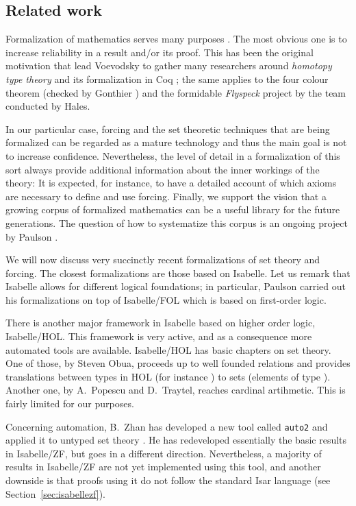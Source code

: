 \subsection{Related work}\label{sec:related-work}
Formalization of mathematics serves many purposes
\cite{simpson-theorem-proving-math}. The most obvious one is to
increase reliability in a result and/or its proof. This has been the
original motivation that lead Voevodsky to gather many researchers
around \emph{homotopy type theory} and its formalization in Coq
\cite{hottbook}; the same applies to the four colour theorem (checked
by Gonthier \cite{MR2463991}) and the formidable \emph{Flyspeck}
project \cite{MR3659768} by the team conducted by Hales.

In our particular case, forcing and the set theoretic techniques that
are being formalized can be regarded as a mature technology and thus
the main goal is not to increase confidence. Nevertheless, the level
of detail in a formalization of this sort always provide additional
information about the inner workings of the theory: It is expected, for
instance, to have a detailed account of which axioms are necessary to
define and use forcing. Finally, we support the vision that a growing
corpus of formalized mathematics can be a useful library for the
future generations. The question of how to systematize this corpus is
an ongoing project by Paulson \cite{ALEXANDRIA}.

We will now discuss very succinctly recent formalizations of
set theory and forcing. The closest formalizations are those based on
Isabelle. Let us remark that Isabelle allows for different logical
foundations; in particular, Paulson carried out his formalizations
on top of Isabelle/FOL which is based on first-order logic.

There is another major framework in Isabelle based on higher order
logic, Isabelle/HOL. This framework is very active, and as a 
consequence more automated tools are available. Isabelle/HOL has 
basic chapters on set theory. One of those, by Steven Obua, proceeds up to
well founded relations and provides translations between types in HOL
(for instance ) to  sets  (elements of type
). Another one, by A.~Popescu and D.~Traytel, reaches
cardinal artihmetic. This is fairly limited for our purposes.

Concerning automation, B.~Zhan has developed a new tool called
\texttt{auto2} and applied it to untyped set theory
\cite{10.1007/978-3-319-66107-0_32}. He has redeveloped essentially
the basic results in Isabelle/ZF, but goes in a different
direction. Nevertheless, a majority of results in
Isabelle/ZF are not yet implemented using this tool, and  another
downside is that proofs using it do not follow the standard Isar
language (see Section~\ref{sec:isabellezf}).

